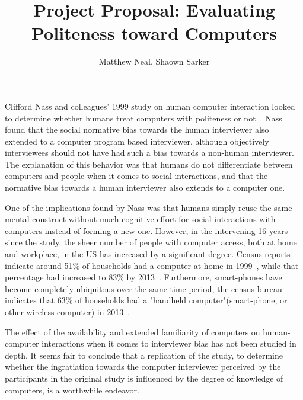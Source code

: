 \documentclass[english]{article}
\begin{document}
\title{Project Proposal: Evaluating Politeness toward Computers}
\author{Matthew Neal, Shaown Sarker}
\maketitle

Clifford Nass and colleagues' 1999 study on human computer interaction looked to determine whether humans treat computers with politeness or not~\cite{nass1999}. Nass found that the social normative bias towards the human interviewer also extended to a computer program based interviewer, although objectively interviewees should not have had such a bias towards a non-human interviewer. The explanation of this behavior was that humans do not differentiate between computers and people when it comes to social interactions, and that the normative bias towards a human interviewer also extends to a computer one.

One of the implications found by Nass was that humans simply reuse the same mental construct without much cognitive effort for social interactions with computers instead of forming a new one. However, in the intervening 16 years since the study, the sheer number of people with computer access, both at home and workplace, in the US has increased by a significant degree. Census reports indicate around 51\% of households had a computer at home in 1999~\cite{newburger2001}, while that percentage had increased to 83\% by 2013~\cite{file2014}. Furthermore, smart-phones have become completely ubiquitous over the same time period, the census bureau indicates that 63\% of households had a "handheld computer"(smart-phone, or other wireless computer) in 2013~\cite{file2014}. 

The effect of the availability and extended familiarity of computers on human-computer interactions when it comes to interviewer bias has not been studied in depth. It seems fair to conclude that a replication of the study, to determine whether the ingratiation towards the computer interviewer perceived by the participants in the original study is influenced by the degree of knowledge of computers, is a worthwhile endeavor.
\end{document}
